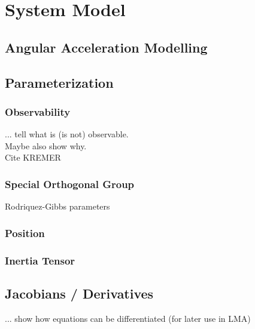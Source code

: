\chapter{System Model}
\label{chap:sysmod}

\section{Angular Acceleration Modelling}

\section{Parameterization}
\subsection{Observability}
... tell what is (is not) observable. \\ Maybe also show why. \\ Cite KREMER

\subsection{Special Orthogonal Group}
Rodriquez-Gibbs parameters

\subsection{Position}

\subsection{Inertia Tensor}

\section{Jacobians / Derivatives}
... show how equations can be differentiated (for later use in LMA)